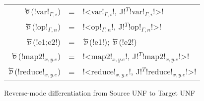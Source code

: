 \begin{figure*}[t]
    \begin{tabular}{r c l}
    $\Dsynrevsymbol$(!var!$_{\Gamma,i}$) &=& !<var!$_{\Gamma,i}$!, J!$^T$!var!$_{\Gamma,i}$!>! \\
    $\Dsynrevsymbol$(!op!$_{\Gamma,n}$) &=& !<op!$_{\Gamma,n}$!, J!$^T$!op!$_{\Gamma,n}$!>! \\ 
    $\Dsynrevsymbol$(!e1;e2!) &=& $\Dsynrevsymbol$(!e1!); $\Dsynrevsymbol$(!e2!)\\ 
    $\Dsynrevsymbol$(!map2!$_{x,y.e}$) &=& !<map2!$_{x,y.e}$!, J!$^T$!map2!$_{x,y.e}$!>! \\ 
    $\Dsynrevsymbol$(!reduce!$_{x,y.e}$) &=& !<reduce!$_{x,y.e}$!, J!$^T$!reduce!$_{x,y.e}$!>! \\  
    \end{tabular}
    \caption{Reverse-mode differentiation from Source UNF to Target UNF}
    \label{fig:diff_macro}    
\end{figure*}